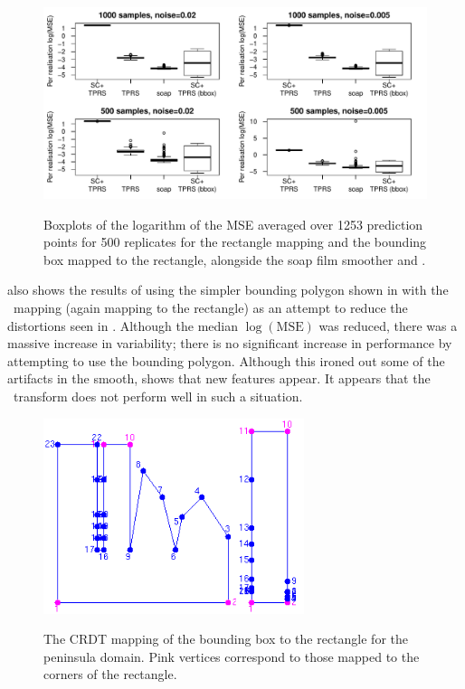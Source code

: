 \begin{figure}[p]
\centering
\includegraphics[width=6in]{sc/figs/wigglytop2-boxplot.pdf} \\
\caption{Boxplots of the logarithm of the MSE averaged over 1253 prediction points for 500 replicates for the rectangle mapping and the bounding box mapped to the rectangle, alongside the soap film smoother and \tprs.}
\label{wigglytop2-boxplots}
\end{figure}

 also shows the results of using the simpler bounding polygon shown in  with the \sch\ mapping (again mapping to the rectangle) as  an attempt to reduce the distortions seen in . Although the median $\log(\text{MSE})$ was reduced, there was a massive increase in variability; there is no significant increase in performance by attempting to use the bounding polygon. Although this ironed out some of the artifacts in the smooth,  shows that new features appear. It appears that the \sch\ transform does not perform well in such a situation.

\begin{figure}[t]
\centering
\includegraphics[width=3in]{sc/figs/wigglytop2-bbox-numbered.png} \\
\caption{The CRDT mapping of the bounding box to the rectangle for the peninsula domain. Pink vertices correspond to those mapped to the corners of the rectangle.}
\label{wigglytop2-bbox-numbered}
\end{figure}


